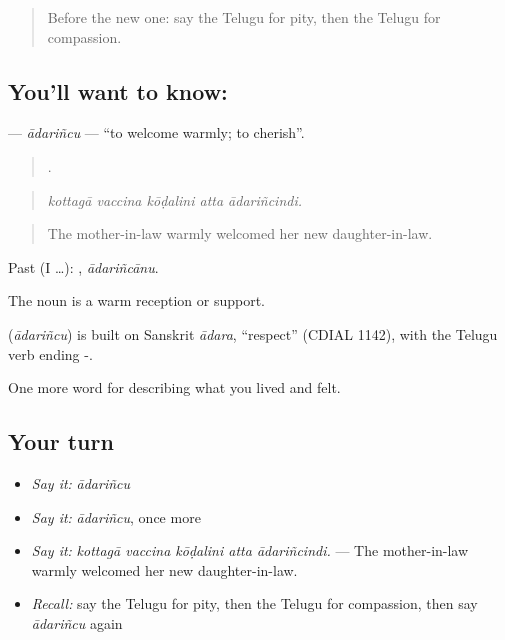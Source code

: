 \label{lesson:TE-C505-adarincu}



\begin{quote}
Before the new one: say the Telugu for pity, then the Telugu for compassion.
\end{quote}

\subsection*{You'll want to know: }
\textbf{} — \emph{ādariñcu} — \textquotedblleft{}to welcome warmly; to cherish\textquotedblright{}.

\begin{quote}
    .
\end{quote}

\begin{quote}
\emph{kottagā vaccina kōḍalini atta ādariñcindi.}
\end{quote}

\begin{quote}
The mother-in-law warmly welcomed her new daughter-in-law.
\end{quote}

Past (I …): , \emph{ādariñcānu}.

The noun  is a warm reception or support.

\begin{cousinweb}
\textbf{} (\emph{ādariñcu}) is built on Sanskrit \emph{ādara}, \textquotedblleft{}respect\textquotedblright{} (CDIAL 1142), with the Telugu verb ending -.
\end{cousinweb}

\begin{grammarlens}[title={What you've built}]
One more word for describing what you lived and felt.
\end{grammarlens}

\subsection*{Your turn}
\begin{itemize}
\raggedright
  \item \emph{Say it:} \emph{ādariñcu}
  \item \emph{Say it:} \emph{ādariñcu}, once more
  \item \emph{Say it:} \emph{kottagā vaccina kōḍalini atta ādariñcindi.} — The mother-in-law warmly welcomed her new daughter-in-law.
  \item \emph{Recall:} say the Telugu for pity, then the Telugu for compassion, then say \emph{ādariñcu} again
\end{itemize}

